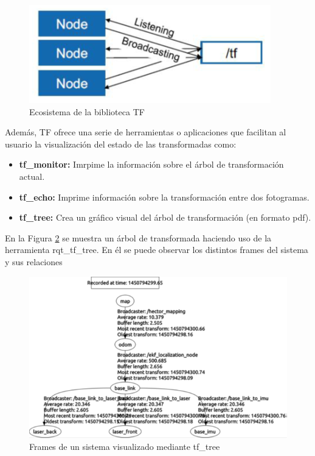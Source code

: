         \begin{figure}[htb]
            \centering
            \includegraphics[width=0.8\linewidth]{Main/Chapter3/Images3/3-6/esquema-funcionamiento-tf.png}
            \caption{Ecosistema de la biblioteca TF}
            \label{f:Cap3-6_ecosistema_tf}
        \end{figure}   
        
        Además, TF ofrece una serie de herramientas o aplicaciones que facilitan al usuario la visualización del estado de las transformadas como:
        
        \begin{itemize}
            \item \textbf{tf\_monitor:} Imrpime la información sobre el árbol de transformación actual.
            \item \textbf{tf\_echo:} Imprime información sobre la transformación entre dos fotogramas.
            \item \textbf{tf\_tree:} Crea un gráfico visual del árbol de transformación (en formato pdf).
        \end{itemize}
        
        En la Figura \ref{f:Cap3-6_sistema_arbol_tf} se muestra un árbol de transformada haciendo uso de la herramienta rqt\_tf\_tree. En él se puede observar los distintos frames del sistema y sus relaciones
        
        \begin{figure}[htb]
            \centering
            \includegraphics[width=1.0\linewidth]{Main/Chapter3/Images3/3-6/ejemplo-frames-sistema-arbol.png}
            \caption{Frames de un sistema visualizado mediante tf\_tree}
            \label{f:Cap3-6_sistema_arbol_tf}
        \end{figure} 
        
